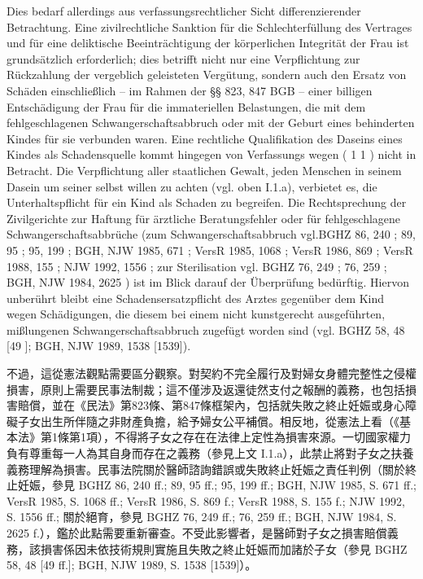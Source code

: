 \documentclass[12pt]{article}
\begin{document}
\begin{sourcepara}[title={原文D.150}]
Dies bedarf allerdings aus verfassungsrechtlicher Sicht differenzierender Betrachtung. Eine zivilrechtliche Sanktion für die Schlechterfüllung des Vertrages und für eine deliktische Beeinträchtigung der körperlichen Integrität der Frau ist grundsätzlich erforderlich; dies betrifft nicht nur eine Verpflichtung zur Rückzahlung der vergeblich geleisteten Vergütung, sondern auch den Ersatz von Schäden einschließlich -- im Rahmen der §§ 823, 847 BGB -- einer billigen Entschädigung der Frau für die immateriellen Belastungen, die mit dem fehlgeschlagenen Schwangerschaftsabbruch oder mit der Geburt eines behinderten Kindes für sie verbunden waren. Eine rechtliche Qualifikation des Daseins eines Kindes als Schadensquelle kommt hingegen von Verfassungs wegen (\abbrArt{} 1 \abbrAbs{} 1 \abbrGG{}\ggfnArtOneOneDE{}) nicht in Betracht. Die Verpflichtung aller staatlichen Gewalt, jeden Menschen in seinem Dasein um seiner selbst willen zu achten (vgl. oben I.1.a), verbietet es, die Unterhaltspflicht für ein Kind als Schaden zu begreifen. Die Rechtsprechung der Zivilgerichte zur Haftung für ärztliche Beratungsfehler oder für fehlgeschlagene Schwangerschaftsabbrüche (zum Schwangerschaftsabbruch vgl.BGHZ 86, 240 \abbrFF{}; 89, 95 \abbrFF{}; 95, 199 \abbrFF{}; BGH, NJW 1985, \abbrS{} 671 \abbrFF{}; VersR 1985, \abbrS{} 1068 \abbrFF{}; VersR 1986, \abbrS{} 869 \abbrF{}; VersR 1988, \abbrS{} 155 \abbrF{}; NJW 1992, \abbrS{} 1556 \abbrFF{}; zur Sterilisation vgl. BGHZ 76, 249 \abbrFF{}; 76, 259 \abbrFF{}; BGH, NJW 1984, \abbrS{} 2625 \abbrF{}) ist im Blick darauf der Überprüfung bedürftig. Hiervon unberührt bleibt eine Schadensersatzpflicht des Arztes gegenüber dem Kind wegen Schädigungen, die diesem bei einem nicht kunstgerecht ausgeführten, mißlungenen Schwangerschaftsabbruch zugefügt worden sind (vgl. BGHZ 58, 48 [49 \abbrFF{}]; BGH, NJW 1989, \abbrS{} 1538 [1539]).
\end{sourcepara}
\begin{transpara}
不過，這從憲法觀點需要區分觀察。對契約不完全履行及對婦女身體完整性之侵權損害，原則上需要民事法制裁；這不僅涉及返還徒然支付之報酬的義務，也包括損害賠償，並在《民法》第823條、第847條框架內，包括就失敗之終止妊娠或身心障礙子女出生所伴隨之非財產負擔，給予婦女公平補償。相反地，從憲法上看（《基本法》第1條第1項\ggfnArtOneOneZH{}），不得將子女之存在在法律上定性為損害來源。一切國家權力負有尊重每一人為其自身而存在之義務（參見上文 I.1.a），此禁止將對子女之扶養義務理解為損害。民事法院關於醫師諮詢錯誤或失敗終止妊娠之責任判例（關於終止妊娠，參見 BGHZ 86, 240 ff.; 89, 95 ff.; 95, 199 ff.; BGH, NJW 1985, S. 671 ff.; VersR 1985, S. 1068 ff.; VersR 1986, S. 869 f.; VersR 1988, S. 155 f.; NJW 1992, S. 1556 ff.; 關於絕育，參見 BGHZ 76, 249 ff.; 76, 259 ff.; BGH, NJW 1984, S. 2625 f.），鑑於此點需要重新審查。不受此影響者，是醫師對子女之損害賠償義務，該損害係因未依技術規則實施且失敗之終止妊娠而加諸於子女（參見 BGHZ 58, 48 [49 ff.]; BGH, NJW 1989, S. 1538 [1539]）。
\end{transpara}
\end{document}

